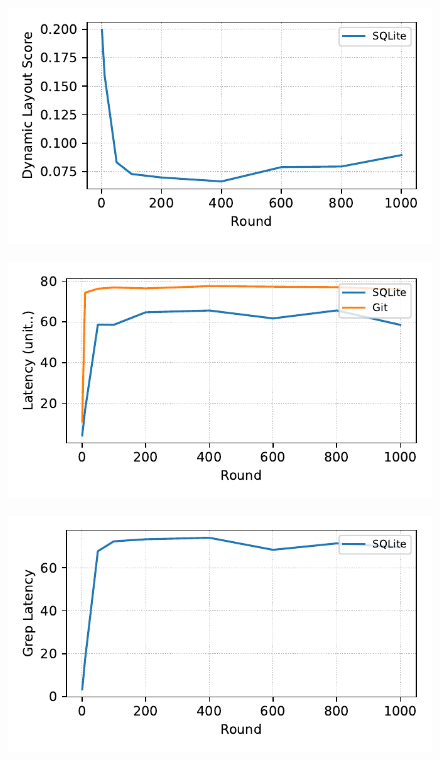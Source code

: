 \begin{figure}[t]
    \centering
    \includegraphics[width=0.95\columnwidth]{graphs/py_graph/dynamic-f2fs}
    \caption{}
    \label{f:f2fs_dynamic_score}
\end{figure}


\begin{figure}[t]
    \centering
    \includegraphics[width=0.95\columnwidth]{graphs/py_graph/latency}
    \caption{}
    \label{f:latency}
\end{figure}

\begin{figure}[t]
    \centering
    \includegraphics[width=0.95\columnwidth]{graphs/py_graph/latency-f2fs}
    \caption{}
    \label{f:f2fs_latency}
\end{figure}


